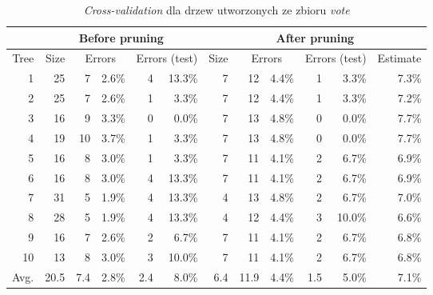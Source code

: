 \begin{table}
\begin{tabular}{|r||r|rr|rr||r|rr|rr|r|}
\hline
&\multicolumn{5}{c||}{Before pruning}&\multicolumn{6}{|c|}{After pruning} \\
\hline
Tree & 
Size & 
\multicolumn{2}{|c|}{Errors} & 
\multicolumn{2}{c||}{Errors (test)} & 
Size & 
\multicolumn{2}{|c|}{Errors} & 
\multicolumn{2}{|c|}{Errors (test)} & 
Estimate \\
\hline\hline
    1 &   25 &    7 & 2.6\% &    4 & 13.3\% &    7 &   12 & 4.4\% &    1 &  3.3\%  &   7.3\%  \\
    2 &   25 &    7 & 2.6\% &    1 &  3.3\% &    7 &   12 & 4.4\% &    1 &  3.3\%  &   7.2\%  \\
    3 &   16 &    9 & 3.3\% &    0 &  0.0\% &    7 &   13 & 4.8\% &    0 &  0.0\%  &   7.7\%  \\
    4 &   19 &   10 & 3.7\% &    1 &  3.3\% &    7 &   13 & 4.8\% &    0 &  0.0\%  &   7.7\%  \\
    5 &   16 &    8 & 3.0\% &    1 &  3.3\% &    7 &   11 & 4.1\% &    2 &  6.7\%  &   6.9\%  \\
    6 &   16 &    8 & 3.0\% &    4 & 13.3\% &    7 &   11 & 4.1\% &    2 &  6.7\%  &   6.9\%  \\
    7 &   31 &    5 & 1.9\% &    4 & 13.3\% &    4 &   13 & 4.8\% &    2 &  6.7\%  &   7.0\%  \\
    8 &   28 &    5 & 1.9\% &    4 & 13.3\% &    4 &   12 & 4.4\% &    3 & 10.0\%  &   6.6\%  \\
    9 &   16 &    7 & 2.6\% &    2 &  6.7\% &    7 &   11 & 4.1\% &    2 &  6.7\%  &   6.8\%  \\
   10 &   13 &    8 & 3.0\% &    3 & 10.0\% &    7 &   11 & 4.1\% &    2 &  6.7\%  &   6.8\%  \\
\hline\hline
 Avg. & 20.5 &  7.4 & 2.8\% &  2.4 & 8.0\%  &  6.4 & 11.9 & 4.4\% &  1.5 &  5.0\%  &   7.1\%  \\
\hline
\end{tabular}
\caption{\emph{Cross-validation} dla drzew utworzonych ze zbioru \emph{vote}}
\label{p2t2-vote-trees-cv}
\end{table}
